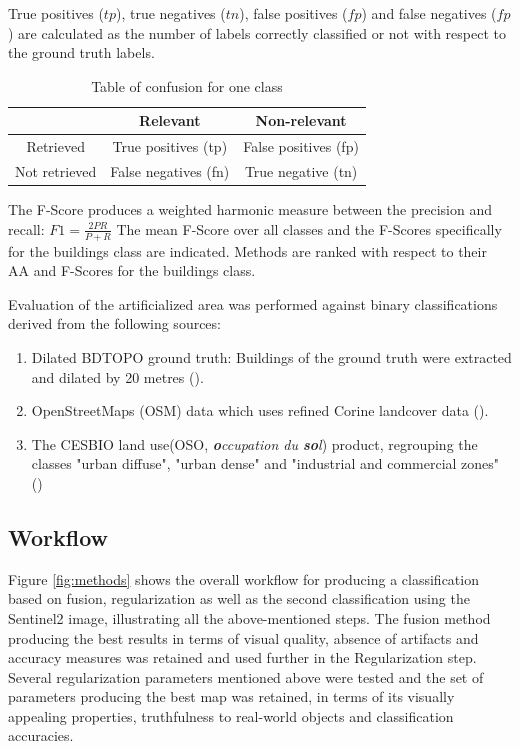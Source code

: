 \documentclass[10pt]{article}
\begin{document}
\begin{itemize}
\begin{itemize}
    \end{itemize}
    True positives ($tp$), true negatives ($tn$), false positives ($fp$) and false negatives ($fp$) are calculated as the number of labels correctly classified or not with respect to the ground truth labels.
    \begin{table}[H]
        \centering
        \begin{tabular}{c|c|c}
    	    & Relevant & Non-relevant \\\hline
    	    Retrieved & True positives (tp) & False positives (fp) \\\hline
    	    Not retrieved & False negatives (fn) & True negative (tn)
        \end{tabular}
        \caption{Table of confusion for one class}
    \end{table}
    The F-Score produces a weighted harmonic measure between the precision and recall:
	$F1=\frac{2PR}{P+R}$
    The mean F-Score over all classes and the F-Scores specifically for the buildings class are indicated. Methods are ranked with respect to their AA and F-Scores for the buildings class.
\end{itemize}


Evaluation of the artificialized area was performed against binary classifications derived from the following sources:
\begin{enumerate}
    \item Dilated BDTOPO ground truth: Buildings of the ground truth were extracted and dilated by 20 metres (\cite{bdtopo}).
    \item OpenStreetMaps (OSM) data which uses refined Corine landcover data (\cite{osm,corine}).
    \item The CESBIO land use(OSO, \textit{\textbf{o}ccupation du \textbf{so}l}) product, regrouping the classes "urban diffuse", "urban dense" and "industrial and commercial zones" (\cite{oso})
\end{enumerate}




\subsection{Workflow}
Figure \ref{fig:methods} shows the overall workflow for producing a classification based on fusion, regularization as well as the second classification using the Sentinel2 image, illustrating all the above-mentioned steps. The fusion method producing the best results in terms of visual quality, absence of artifacts and accuracy measures was retained and used further in the Regularization step. Several regularization parameters mentioned above were tested and the set of parameters producing the best map was retained, in terms of its visually appealing properties, truthfulness to real-world objects and classification accuracies.
\end{document}
